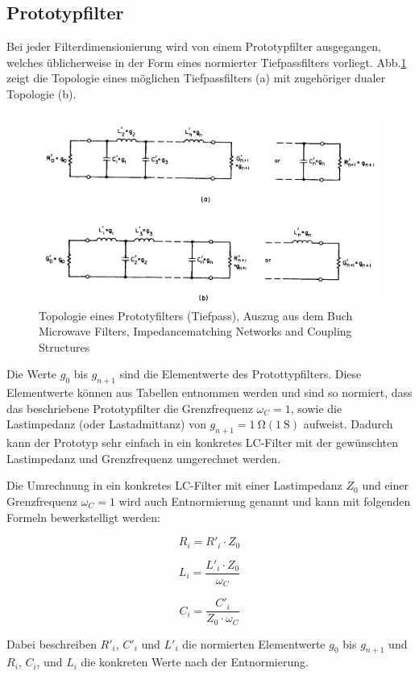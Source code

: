 \subsection{Prototypfilter}
\label{sec:Protototypfilter}

Bei jeder Filterdimensionierung wird von einem Prototypfilter ausgegangen, welches üblicherweise in der Form eines normierter Tiefpassfilters vorliegt. Abb.\ref{fig:Prototyp_Filter} zeigt die Topologie eines möglichen Tiefpassfilters (a) mit zugehöriger dualer Topologie (b).

\begin{figure}[h!]
\centering
 	\includegraphics[width=\imagewidth]{images/Prototyp_Filter.png}
 	\caption{Topologie eines Prototyfilters (Tiefpass), Auszug aus dem Buch Microwave Filters, Impedancematching Networks and Coupling Structures \cite[p.~95]{ref:matthaei} }
 	\label{fig:Prototyp_Filter}
\end{figure}



Die Werte $g_0$ bis $g_{n+1}$ sind die Elementwerte des Protottypfilters. Diese Elementwerte können aus Tabellen entnommen werden und sind so normiert, dass das beschriebene  Prototypfilter die Grenzfrequenz $\omega_{C} = 1$, sowie die Lastimpedanz (oder Lastadmittanz) von $g_{n+1}=\SI{1}{\ohm} (\SI{1}{\siemens})$ aufweist. Dadurch kann der Prototyp sehr einfach in ein konkretes LC-Filter mit der gewünschten Lastimpedanz und Grenzfrequenz umgerechnet werden. 

Die Umrechnung in ein konkretes LC-Filter mit einer Lastimpedanz $Z_0$ und einer Grenzfrequenz $\omega_{C} = 1$ wird auch Entnormierung genannt und kann mit folgenden Formeln bewerkstelligt werden: 

\begin{equation}\label{eq:R}	
R_i = R'_i \cdot Z_0
\end{equation}

\begin{equation}\label{eq:L}	
L_i = \frac{L'_i \cdot Z_0}{\omega_{C}}
\end{equation}

\begin{equation}\label{eq:C}	
C_i = \frac{C'_i}{Z_0 \cdot \omega_{C}}
\end{equation}

Dabei beschreiben  $R'_i$, $C'_i$ und $L'_i$ die normierten Elementwerte  $g_0$ bis $g_{n+1}$ und $R_i$, $C_i$, und $L_i$ die konkreten Werte nach der Entnormierung.
